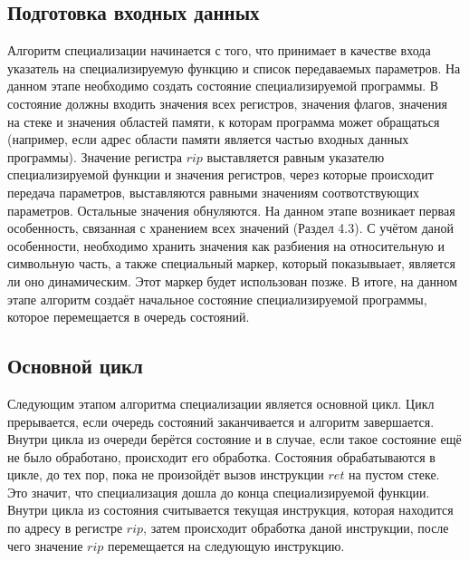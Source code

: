\documentclass{spbau-diploma}
\begin{document}
\subsection{ Подготовка входных данных}
Алгоритм специализации начинается с того, что принимает в качестве входа указатель на специализируемую функцию и список передаваемых параметров. На данном этапе необходимо создать состояние специализируемой программы. В состояние должны входить значения всех регистров, значения флагов, значения на стеке и значения областей памяти, к которам программа может обращаться (например, если адрес области памяти является частью входных данных программы). Значение регистра $rip$ выставляется равным указателю специализируемой функции и значения регистров, через которые происходит передача параметров, выставляются равными значениям соотвотствующих параметров. Остальные значения обнуляются. На данном этапе возникает первая особенность, связанная с хранением всех значений (Раздел 4.3).
С учётом даной особенности, необходимо хранить значения как разбиения на относительную и символьную часть, а также специальный маркер, который показывыает, является ли оно динамическим. Этот маркер будет использован позже. В итоге, на данном этапе алгоритм создаёт начальное состояние специализируемой программы, которое перемещается в очередь состояний.

\subsection{Основной цикл}
Следующим этапом алгоритма специализации является основной цикл. Цикл прерывается, если очередь состояний заканчивается и алгоритм завершается. Внутри цикла из очереди берётся состояние и в случае, если такое состояние ещё не было обработано, происходит его обработка. Состояния обрабатываются в цикле, до тех пор, пока не произойдёт вызов инструкции $ret$ на пустом стеке. Это значит, что специализация дошла до конца специализируемой функции. Внутри цикла из состояния считывается текущая инструкция, которая находится по адресу в регистре $rip$, затем происходит обработка даной инструкции, после чего значение $rip$ перемещается на следующую инструкцию.
\end{document}
